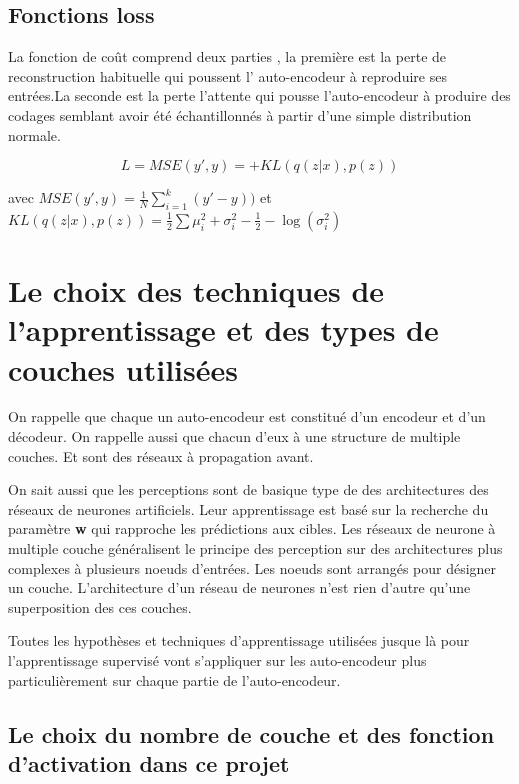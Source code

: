 \documentclass[12pt,a4paper]{report}
\begin{document}
\subsection{Fonctions loss }

La fonction de coût comprend deux parties , la première est la perte de reconstruction habituelle qui poussent l' auto-encodeur à reproduire ses entrées.La seconde est la perte l'attente qui pousse l'auto-encodeur à produire des codages semblant avoir été échantillonnés à partir d'une simple distribution normale. 

\begin{equation}
L=MSE(y',y)=+KL(q(z|x),p(z))
\end{equation}

avec $MSE(y',y)=\frac{1}{N}\sum_{i=1}^{k}(y'-y))$ et  $KL(q(z|x),p(z))=\frac{1}{2}\sum \mu_{i}^2 +\sigma_{i}^2 -\frac{1}{2} -\log(\sigma_{i}^2)$

\section{ Le choix des  techniques de l'apprentissage et des types de couches utilisées }
On rappelle que chaque un auto-encodeur est constitué d'un  encodeur et d'un décodeur. On rappelle aussi que chacun d'eux à une structure de multiple couches. Et sont des réseaux à propagation avant.

On sait aussi  que les perceptions sont  de basique type de des architectures des réseaux de neurones artificiels. Leur apprentissage est basé sur la recherche du paramètre \textbf{w} qui rapproche les prédictions aux cibles.
Les réseaux de neurone à multiple couche généralisent le principe des perception sur des architectures plus complexes à plusieurs noeuds d'entrées. 
Les noeuds sont arrangés pour désigner un couche. L'architecture d'un réseau de neurones n'est rien d'autre qu'une superposition des  ces couches. 

Toutes les hypothèses et techniques d'apprentissage utilisées jusque là pour l'apprentissage supervisé vont s'appliquer sur les auto-encodeur plus particulièrement sur chaque partie de l'auto-encodeur. 

\subsection{Le choix du nombre de couche  et des fonction  d'activation dans ce projet } 
\end{document}
